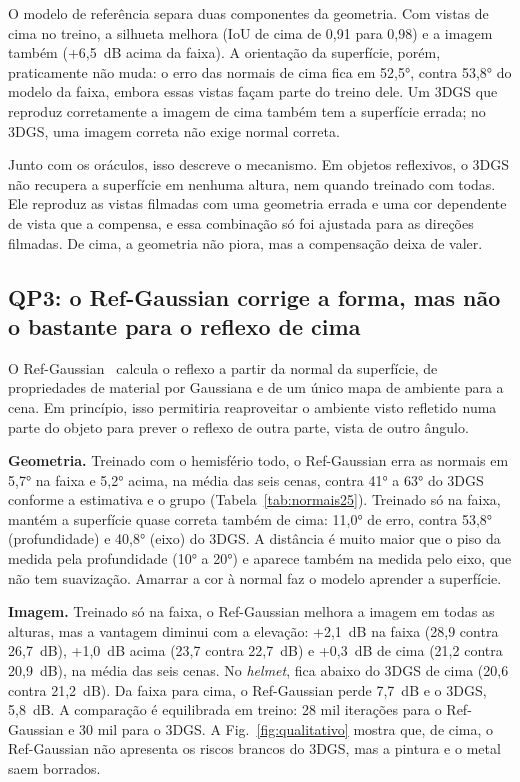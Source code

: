 

O modelo de referência separa duas componentes da geometria. Com vistas de cima no treino, a silhueta melhora (IoU de cima de 0,91 para 0,98) e a imagem também (+6,5~dB acima da faixa). A orientação da superfície, porém, praticamente não muda: o erro das normais de cima fica em 52,5°, contra 53,8° do modelo da faixa, embora essas vistas façam parte do treino dele. Um 3DGS que reproduz corretamente a imagem de cima também tem a superfície errada; no 3DGS, uma imagem correta não exige normal correta.

Junto com os oráculos, isso descreve o mecanismo. Em objetos reflexivos, o 3DGS não recupera a superfície em nenhuma altura, nem quando treinado com todas. Ele reproduz as vistas filmadas com uma geometria errada e uma cor dependente de vista que a compensa, e essa combinação só foi ajustada para as direções filmadas. De cima, a geometria não piora, mas a compensação deixa de valer.

\subsection{QP3: o Ref-Gaussian corrige a forma, mas não o bastante para o reflexo de cima}\label{sec:refgs}

O Ref-Gaussian~\cite{yao2025refgaussian} calcula o reflexo a partir da normal da superfície, de propriedades de material por Gaussiana e de um único mapa de ambiente para a cena. Em princípio, isso permitiria reaproveitar o ambiente visto refletido numa parte do objeto para prever o reflexo de outra parte, vista de outro ângulo.

\textbf{Geometria.} Treinado com o hemisfério todo, o Ref-Gaussian erra as normais em 5,7° na faixa e 5,2° acima, na média das seis cenas, contra 41° a 63° do 3DGS conforme a estimativa e o grupo (Tabela~\ref{tab:normais25}). Treinado só na faixa, mantém a superfície quase correta também de cima: 11,0° de erro, contra 53,8° (profundidade) e 40,8° (eixo) do 3DGS. A distância é muito maior que o piso da medida pela profundidade (10° a 20°) e aparece também na medida pelo eixo, que não tem suavização. Amarrar a cor à normal faz o modelo aprender a superfície.



\textbf{Imagem.} Treinado só na faixa, o Ref-Gaussian melhora a imagem em todas as alturas, mas a vantagem diminui com a elevação: +2,1~dB na faixa (28,9 contra 26,7~dB), +1,0~dB acima (23,7 contra 22,7~dB) e +0,3~dB de cima (21,2 contra 20,9~dB), na média das seis cenas. No \textit{helmet}, fica abaixo do 3DGS de cima (20,6 contra 21,2~dB). Da faixa para cima, o Ref-Gaussian perde 7,7~dB e o 3DGS, 5,8~dB. A comparação é equilibrada em treino: 28 mil iterações para o Ref-Gaussian e 30 mil para o 3DGS. A Fig.~\ref{fig:qualitativo} mostra que, de cima, o Ref-Gaussian não apresenta os riscos brancos do 3DGS, mas a pintura e o metal saem borrados.


